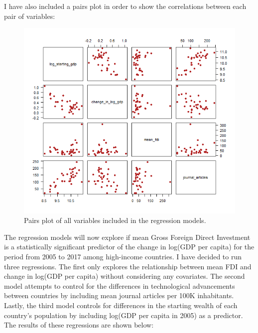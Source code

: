 \documentclass{article}
\begin{document}
I have also included a pairs plot in order to show the correlations between each pair of variables:
\begin{figure}	
	\centering
	\includegraphics[width=\linewidth]{Rplot.png}
	\caption{Pairs plot of all variables included in the regression models.}
	\label{fig:pairs}
\end{figure}
\newpage
The regression models will now explore if mean Gross Foreign Direct Investment is a statistically significant predictor of the change in log(GDP per capita) for the period from 2005 to 2017 among high-income countries. I have decided to run three regressions. The first only explores the relationship between mean FDI and change in log(GDP per capita) without considering any covariates. The second model attempts to control for the differences in technological advancements between countries by including mean journal articles per 100K inhabitants. Lastly, the third model controls for differences in the starting wealth of each country's population by including log(GDP per capita in 2005) as a predictor. The results of these regressions are shown below:
\end{document}
